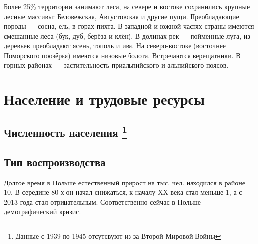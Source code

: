 \documentclass[12pt]{article}
\begin{document}
Более 25\% территории занимают леса, на севере и востоке сохранились крупные лесные массивы: Беловежская, Августовская и другие пущи.
Преобладающие породы --- сосна, ель, в горах пихта.
В западной и южной частях страны имеются смешанные леса (бук, дуб, берёза и клён).
В долинах рек --- пойменные луга, из деревьев преобладают ясень, тополь и ива.
На северо-востоке (восточнее Поморского поозёрья) имеются низовые болота.
Встречаются верещатники.
В горных районах --- растительность приальпийского и альпийского поясов.

\section{Население и трудовые ресурсы}
\subsection[Численность населения]{Численность населения \footnote{Данные с 1939 по 1945 отсутсвуют из-за Второй Мировой Войны}}

\subsection{Тип воспроизводства}
Долгое время в Польше естественный прирост на тыс. чел. находился в районе 10.
В середине 80-х он начал снижаться, к началу XX века стал меньше 1, а с 2013 года стал отрицательным.
Соответственно сейчас в Польше демографический кризис.
\end{document}
